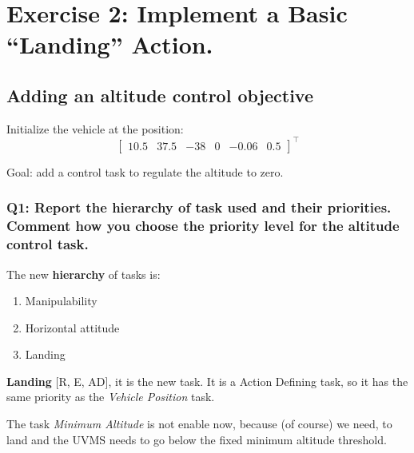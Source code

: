 \documentclass{article}
\begin{document}
\clearpage

\section{Exercise 2: Implement a Basic “Landing” Action.}
\subsection{Adding an altitude control objective}
Initialize the vehicle at the position:
\begin{displaymath}
\begin{bmatrix} 10.5 & 37.5 & -38 & 0 & -0.06 & 0.5 \end{bmatrix}^\top
\end{displaymath} 

Goal: add a control task to regulate the altitude to zero.

\subsubsection{Q1: Report the hierarchy of task used and their priorities. Comment how you choose the priority level for the altitude control task.}

\noindent
\vspace{5px}
The new \textbf{hierarchy} of tasks is:
\begin{enumerate}
	\item Manipulability
	\item Horizontal attitude
	\item Landing
\end{enumerate}

\noindent
\vspace{2px}
\begin{description}
\item \textbf{Landing} [R, E, AD], it is the new task. It is a Action Defining task, so it has the same priority as the \textit{Vehicle Position} task.
\end{description}

\noindent
The task \textit{Minimum Altitude} is not enable now, because (of course) we need, to land and the UVMS needs to go below the fixed minimum altitude threshold.
\end{document}
